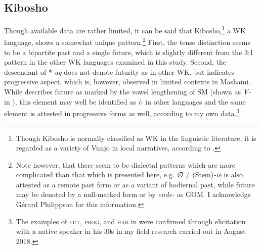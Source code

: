 \documentclass[output=paper]{langscibook}
\begin{document}
\subsection{Kibosho \citep{Kagaya1989}}\label{sec:shinagawa:2.6}

Though available data are rather limited, it can be said that Kibosho,\footnote{Though Kibosho is normally classified as WK in the linguistic literature, it is regarded as a variety of Vunjo in local narratives, according to \citet{Kagaya2006}.} a WK language, shows a somewhat unique pattern.\footnote{Note however, that there seem to be dialectal patterns which are more complicated than that which is presented here, e.g. \textit{∅}{\textit{${\neq}$}}(Stem)\textit{{}-ie} is also attested as a remote past form or as a variant of hodiernal past, while future may be denoted by a null-marked form or by \textit{ende-} as GOM. I acknowledge Gérard Philippson for this information.} First, the tense distinction seems to be a bipartite past and a single future, which is slightly different from the 3:1 pattern in the other WK languages examined in this study. Second, the descendant of *\textit{{}-ag} does not denote futurity as in other WK, but indicates progressive aspect, which is, however, observed in limited contexts in Mashami. While \citet[829]{Kagaya1989} describes future as marked by the vowel lengthening of SM (shown as \textit{V-} in ), this element may well be identified as \textit{i-} in other languages and the same element is attested in progressive forms as well, according to my own data.\footnote{The examples of \textsc{fut}, \textsc{prog}, and \textsc{hab} in  were confirmed through elicitation with a native speaker in his 30s in my field research carried out in August 2018.}
\end{document}
